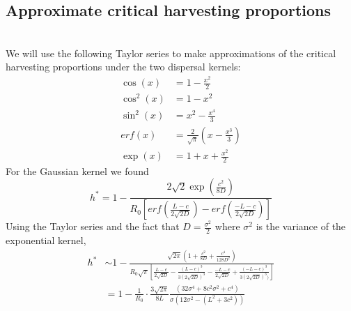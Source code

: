 \documentclass[12pt,english]{article}
\begin{document}
\subsection{Approximate critical harvesting proportions \label{approxcrit}}
~\\We will use the following Taylor series to make approximations of the critical harvesting proportions under the two dispersal kernels:
\begin{align*}
\cos(x)&=1-\frac{x^2}{2}
\\ \cos^2(x)&=1-x^2
\\ \sin^2(x)&=x^2-\frac{x^4}{3}
\\ erf(x)&=\frac{2}{\sqrt{\pi}}(x-\frac{x^3}{3})
\\ \exp(x)&=1+x+\frac{x^2}{2}
\end{align*}
For the Gaussian kernel we found 
\begin{equation}
h^*=1-\frac{2\sqrt{2}\exp\left(\frac{c^{2}}{8D}\right)}{R_0\left[erf\left(\frac{L-c}{2\sqrt{2D}}\right)-erf\left(\frac{-L-c}{2\sqrt{2D}}\right)\right]}
\end{equation} 
Using the Taylor series and the fact that $D=\frac{\sigma^2}{2}$ where $\sigma^2$ is the variance of the exponential kernel,
\begin{align*}
h^*&\sim 1-\frac{\sqrt{2\pi}(1+\frac{c^2}{8D}+\frac{c^4}{128D^2})}{R_0\sqrt{\pi}\left[\frac{L-c}{2\sqrt{2D}}-\frac{(L-c)^3}{3(2\sqrt{2D})^3}-\frac{-L-c}{2\sqrt{2D}}+\frac{(-L-c)^3}{3(2\sqrt{2D})^3)}\right]}
\\&= 1-\frac{1}{R_0}\cdot\frac{3\sqrt{2\pi}}{8L}\frac{(32\sigma^4+8c^2\sigma^2+c^4)}{\sigma\left(12\sigma^2-(L^2+3c^2)\right)}
\end{align*}
\end{document}
